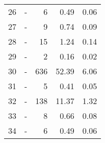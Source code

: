 \begin{longtable}{lXrrr}
        26 & \multicolumn{1}{X}{-} & %
          \num{6} &
          \num[round-mode=places,round-precision=2]{0,49} &
          \num[round-mode=places,round-precision=2]{0,06} \\

        27 & \multicolumn{1}{X}{-} & %
          \num{9} &
          \num[round-mode=places,round-precision=2]{0,74} &
          \num[round-mode=places,round-precision=2]{0,09} \\

        28 & \multicolumn{1}{X}{-} & %
          \num{15} &
          \num[round-mode=places,round-precision=2]{1,24} &
          \num[round-mode=places,round-precision=2]{0,14} \\

        29 & \multicolumn{1}{X}{-} & %
          \num{2} &
          \num[round-mode=places,round-precision=2]{0,16} &
          \num[round-mode=places,round-precision=2]{0,02} \\

        30 & \multicolumn{1}{X}{-} & %
          \num{636} &
          \num[round-mode=places,round-precision=2]{52,39} &
          \num[round-mode=places,round-precision=2]{6,06} \\

        31 & \multicolumn{1}{X}{-} & %
          \num{5} &
          \num[round-mode=places,round-precision=2]{0,41} &
          \num[round-mode=places,round-precision=2]{0,05} \\

        32 & \multicolumn{1}{X}{-} & %
          \num{138} &
          \num[round-mode=places,round-precision=2]{11,37} &
          \num[round-mode=places,round-precision=2]{1,32} \\

        33 & \multicolumn{1}{X}{-} & %
          \num{8} &
          \num[round-mode=places,round-precision=2]{0,66} &
          \num[round-mode=places,round-precision=2]{0,08} \\

        34 & \multicolumn{1}{X}{-} & %
          \num{6} &
          \num[round-mode=places,round-precision=2]{0,49} &
          \num[round-mode=places,round-precision=2]{0,06} \\


\end{longtable}
